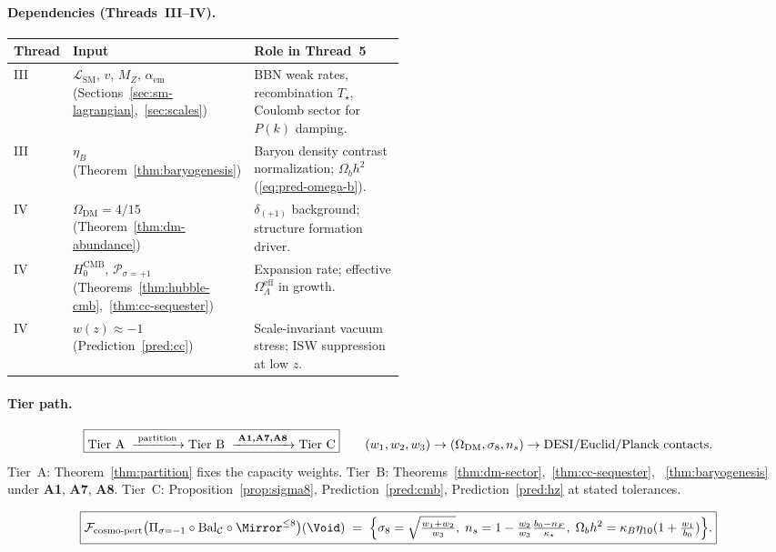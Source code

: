 \paragraph{Dependencies (Threads~III--IV).}
\begin{center}
\small
\renewcommand{\arraystretch}{1.10}
\begin{tabular}{@{}llp{0.50\linewidth}@{}}
\toprule
\textbf{Thread} & \textbf{Input} & \textbf{Role in Thread~5} \\
\midrule
III &
  $\mathcal{L}_{\mathrm{SM}}$, $v$, $M_Z$, $\alpha_{\mathrm{em}}$
  (Sections~\ref{sec:sm-lagrangian},~\ref{sec:scales}) &
  BBN weak rates, recombination $T_\star$, Coulomb sector for $P(k)$ damping. \\
III &
  $\eta_B$ (Theorem~\ref{thm:baryogenesis}) &
  Baryon density contrast normalization; $\Omega_b h^2$
  (\eqref{eq:pred-omega-b}). \\
IV &
  $\Omega_{\mathrm{DM}}=4/15$ (Theorem~\ref{thm:dm-abundance}) &
  $\delta_{(+1)}$ background; structure formation driver. \\
IV &
  $H_0^{\mathrm{CMB}}$, $\mathcal{P}_{\sigma=+1}$
  (Theorems~\ref{thm:hubble-cmb},~\ref{thm:cc-sequester}) &
  Expansion rate; effective $\Omega_\Lambda^{\mathrm{eff}}$ in growth. \\
IV &
  $w(z)\approx -1$ (Prediction~\ref{pred:cc}) &
  Scale-invariant vacuum stress; ISW suppression at low $z$. \\
\bottomrule
\end{tabular}
\end{center}

\paragraph{Tier path.}
\begin{equation}\label{eq:thread5-tier}
  \boxed{%
  \mathrm{Tier~A}
  \;\xrightarrow{\;\text{partition}\;}
  \mathrm{Tier~B}
  \;\xrightarrow{\;\textbf{A1,A7,A8}\;}
  \mathrm{Tier~C}
  }
  \qquad
  (w_1,w_2,w_3)
  \to
  (\Omega_{\mathrm{DM}},\sigma_8,n_s)
  \to
  \text{DESI/Euclid/Planck contacts}.
\end{equation}
Tier~A: Theorem~\ref{thm:partition} fixes the capacity weights.
Tier~B: Theorems~\ref{thm:dm-sector},~\ref{thm:cc-sequester},
~\ref{thm:baryogenesis} under \textbf{A1}, \textbf{A7}, \textbf{A8}.
Tier~C: Proposition~\ref{prop:sigma8}, Prediction~\ref{pred:cmb},
Prediction~\ref{pred:hz} at stated tolerances.

\begin{equation}\label{eq:thread5-boxed}
  \boxed{%
  \mathcal{F}_{\mathrm{cosmo\text{-}pert}}
  \bigl(
    \Pi_{\sigma=-1}\circ\mathrm{Bal}_{\mathcal{C}}\circ\Mirror^{\leq 8}
  \bigr)(\Void)
  \;=\;
  \Bigl\{
    \sigma_8=\sqrt{\tfrac{w_1+w_2}{w_3}},\;
    n_s=1-\tfrac{w_2}{w_3}\tfrac{b_0-n_F}{\kappa_\star},\;
    \Omega_b h^2=\kappa_B\eta_{10}(1+\tfrac{w_1}{b_0})
  \Bigr\}.
  }
\end{equation}

